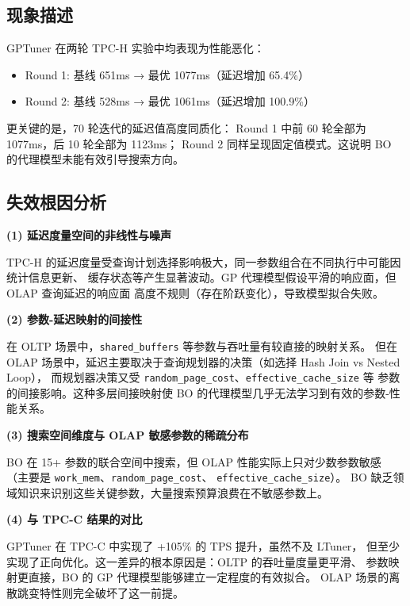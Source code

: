 \subsection{现象描述}

GPTuner 在两轮 TPC-H 实验中均表现为性能恶化：

\begin{itemize}
  \item Round 1: 基线 651ms → 最优 1077ms（延迟增加 65.4\%）
  \item Round 2: 基线 528ms → 最优 1061ms（延迟增加 100.9\%）
\end{itemize}

更关键的是，70 轮迭代的延迟值高度同质化：
Round 1 中前 60 轮全部为 1077ms，后 10 轮全部为 1123ms；
Round 2 同样呈现固定值模式。这说明 BO 的代理模型未能有效引导搜索方向。

\subsection{失效根因分析}

\textbf{(1) 延迟度量空间的非线性与噪声}

TPC-H 的延迟度量受查询计划选择影响极大，同一参数组合在不同执行中可能因统计信息更新、
缓存状态等产生显著波动。GP 代理模型假设平滑的响应面，但 OLAP 查询延迟的响应面
高度不规则（存在阶跃变化），导致模型拟合失败。

\textbf{(2) 参数-延迟映射的间接性}

在 OLTP 场景中，\texttt{shared\_buffers} 等参数与吞吐量有较直接的映射关系。
但在 OLAP 场景中，延迟主要取决于查询规划器的决策（如选择 Hash Join vs Nested Loop），
而规划器决策又受 \texttt{random\_page\_cost}、\texttt{effective\_cache\_size} 等
参数的间接影响。这种多层间接映射使 BO 的代理模型几乎无法学习到有效的参数-性能关系。

\textbf{(3) 搜索空间维度与 OLAP 敏感参数的稀疏分布}

BO 在 15+ 参数的联合空间中搜索，但 OLAP 性能实际上只对少数参数敏感
（主要是 \texttt{work\_mem}、\texttt{random\_page\_cost}、
\texttt{effective\_cache\_size}）。
BO 缺乏领域知识来识别这些关键参数，大量搜索预算浪费在不敏感参数上。

\textbf{(4) 与 TPC-C 结果的对比}

GPTuner 在 TPC-C 中实现了 +105\% 的 TPS 提升，虽然不及 LTuner，
但至少实现了正向优化。这一差异的根本原因是：OLTP 的吞吐量度量更平滑、
参数映射更直接，BO 的 GP 代理模型能够建立一定程度的有效拟合。
OLAP 场景的离散跳变特性则完全破坏了这一前提。


